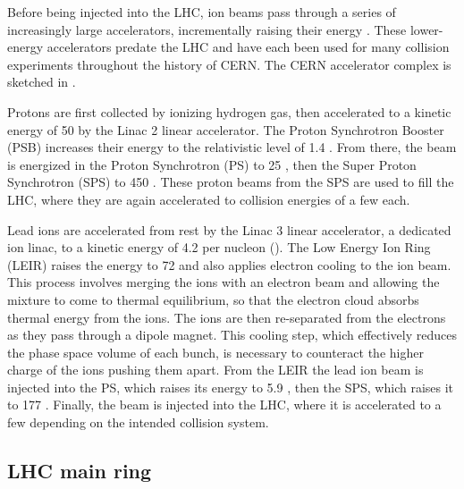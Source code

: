 Before being injected into the LHC, ion beams pass through a series of increasingly large accelerators, incrementally raising their energy \cite{Benedikt:2004wm}.
These lower-energy accelerators predate the LHC and have each been used for many collision experiments throughout the history of CERN.
The CERN accelerator complex is sketched in .

Protons are first collected by ionizing hydrogen gas, then accelerated to a kinetic energy of 50 \MeV by the Linac 2 linear accelerator.
The Proton Synchrotron Booster (PSB) increases their energy to the relativistic level of 1.4 \GeV.
From there, the beam is energized in the Proton Synchrotron (PS) to 25 \GeV, then the Super Proton Synchrotron (SPS) to 450 \GeV.
These proton beams from the SPS are used to fill the LHC, where they are again accelerated to collision energies of a few \TeV each.

Lead ions are accelerated from rest by the Linac 3 linear accelerator, a dedicated ion linac, to a kinetic energy of 4.2 \MeV per nucleon (\MeVn).
The Low Energy Ion Ring (LEIR) raises the energy to 72 \MeVn and also applies electron cooling to the ion beam.
This process involves merging the ions with an electron beam and allowing the mixture to come to thermal equilibrium, so that the electron cloud absorbs thermal energy from the ions.
The ions are then re-separated from the electrons as they pass through a dipole magnet.
This cooling step, which effectively reduces the phase space volume of each bunch, is necessary to counteract the higher charge of the ions pushing them apart. %
From the LEIR the lead ion beam is injected into the PS, which raises its energy to 5.9 \GeVn, then the SPS, which raises it to 177 \GeVn.
Finally, the beam is injected into the LHC, where it is accelerated to a few \TeVn depending on the intended collision system.


\subsection{LHC main ring}

